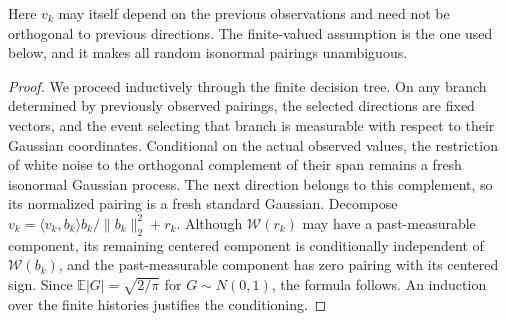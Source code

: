 \documentclass[11pt]{article}
\theoremstyle{definition}
\theoremstyle{remark}
\numberwithin{equation}{section}
\begin{document}
Here $v_k$ may itself depend on the previous observations and need
not be orthogonal to previous directions. The finite-valued assumption
is the one used below, and it makes all random isonormal pairings
unambiguous.

\begin{proof}
We proceed inductively through the finite decision tree. On any
branch determined by previously observed pairings, the selected
directions are fixed vectors, and the event selecting that branch is
measurable with respect to their Gaussian coordinates. Conditional on
the actual observed values, the restriction of white noise to the
orthogonal complement of their span remains a fresh isonormal
Gaussian process. The next direction belongs to this
complement, so its normalized pairing is a fresh standard Gaussian.
Decompose $v_k=\langle v_k,b_k\rangle b_k/\|b_k\|_2^2+r_k$.
Although $\mathcal W(r_k)$ may have a past-measurable component, its
remaining centered component is conditionally independent of
$\mathcal W(b_k)$, and the past-measurable component has zero pairing
with its centered sign. Since $\mathbb E|G|=\sqrt{2/\pi}$ for
$G\sim N(0,1)$, the formula follows. An induction over the finite
histories justifies the conditioning.
\end{proof}
\end{document}
